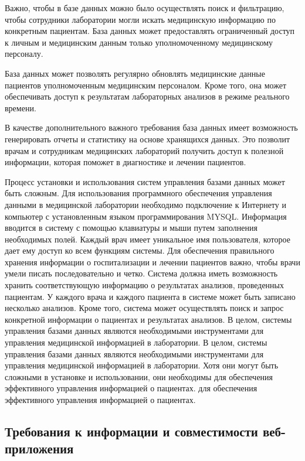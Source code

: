 Важно, чтобы в базе данных можно было осуществлять поиск и фильтрацию, чтобы сотрудники лаборатории могли искать медицинскую информацию по конкретным пациентам. База данных может предоставлять ограниченный доступ к личным и медицинским данным только уполномоченному медицинскому персоналу.

База данных может позволять регулярно обновлять медицинские данные пациентов уполномоченным медицинским персоналом. Кроме того, она может обеспечивать доступ к результатам лабораторных анализов в режиме реального времени.

В качестве дополнительного важного требования база данных имеет возможность генерировать отчеты и статистику на основе хранящихся данных. Это позволит врачам и сотрудникам медицинских лабораторий получить доступ к полезной информации, которая поможет в диагностике и лечении пациентов.

Процесс установки и использования систем управления базами данных может быть сложным. Для использования программного обеспечения управления данными в медицинской лаборатории необходимо подключение к Интернету и компьютер с установленным языком программирования MYSQL. Информация вводится в систему с помощью клавиатуры и мыши путем заполнения необходимых полей.
Каждый врач имеет уникальное имя пользователя, которое дает ему доступ ко всем функциям системы. Для обеспечения правильного хранения информации о госпитализации и лечении пациентов важно, чтобы врачи умели писать последовательно и четко.
Система должна иметь возможность хранить соответствующую информацию о результатах анализов, проведенных пациентам. У каждого врача и каждого пациента в системе может быть записано несколько анализов. Кроме того, система может осуществлять поиск и запрос конкретной информации о пациентах и результатах анализов.
В целом, системы управления базами данных являются необходимыми инструментами для управления медицинской информацией в лаборатории. В целом, системы управления базами данных являются необходимыми инструментами для управления медицинской информацией в лаборатории.
Хотя они могут быть сложными в установке и использовании, они необходимы для обеспечения эффективного управления информацией о пациентах. для обеспечения эффективного управления информацией о пациентах.

\subsection{Требования к информации и совместимости веб-приложения}

